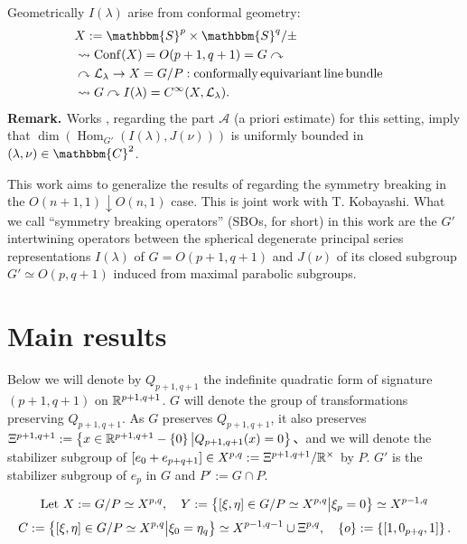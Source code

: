 \documentclass[12pt]{article} %
\newcommand{\assign}{:=}
\newcommand{\tmop}[1]{\ensuremath{\operatorname{#1}}}
\theoremstyle{definition}
\theoremstyle{exampstyle} \newtheorem{examp}[theorem]{Theorem}
\newcommand{\tmtextbf}[1]{{\bfseries{#1}}}
\renewcommand{\setminus}{-}
\begin{document}
 Geometrically $I (\lambda)$ arise from conformal
geometry:
\begin{eqnarray}
  & X \assign \mathbbm{S}^p \times \mathbbm{S}^q / \pm &  \nonumber\\
  & \rightsquigarrow \tmop{Conf} (X) = O (p + 1, q + 1) = G \curvearrowright
  &  \nonumber\\
  & \curvearrowright \mathcal{L}_{\lambda} \rightarrow X = G / P :
  \tmop{conformally} \tmop{equivariant} \tmop{line} \tmop{bundle} & 
  \nonumber\\
  & \rightsquigarrow G \curvearrowright I (\lambda) = C^{\infty} (X,
  \mathcal{L}_{\lambda}) . &  \nonumber
\end{eqnarray}
{\noindent}\tmtextbf{Remark. }Works {\cite{kobayashi2013finite}},
{\cite{kobayashi2014classification}} regarding the part $\mathcal{A}$ (a
priori estimate) for this setting, imply that $\dim (\tmop{Hom}_{G'} (I
(\lambda), J (\nu)))$ is uniformly bounded in $(\lambda, \nu) \in
\mathbbm{C}^2$.{\hspace*{\fill}}{\medskip}


\begin{spacing}{0.8}
	This work aims to generalize the results of \cite{kobayashi2015symmetry}
	regarding the symmetry breaking in the $O(n+1,1)\downarrow O(n,1)$ case. This is joint work with T. Kobayashi.
	What we call ``symmetry breaking operators'' (SBOs, for short) in this work are the $G'$ intertwining operators between the spherical degenerate principal series representations $I(\lambda)$
	of $G=O(p+1,q+1)$ and $J(\nu)$ of its closed subgroup $G'\simeq O(p,q+1)$ induced from maximal parabolic subgroups.
\end{spacing}

\section{Main results}
Below we will denote by $Q_{p+1,q+1}$ the indefinite quadratic form of signature $(p+1,q+1)$ on $\mathbb{R}^{p+1,q+1}$.
$G$ will denote the group of transformations preserving $Q_{p+1,q+1}$. As $G$ preserves $Q_{p+1,q+1}$, it also preserves
$\Xi^{p+1,q+1}:=\mysetn{x\in\R^{p+1,q+1}\setminus\left\{ 0 \right\}}{Q_{p+1,q+1}(x)=0}$、and we will denote the stabilizer subgroup of 
$[e_0+e_{p+q+1}]\in X^{p,q}:=\Xi^{p+1,q+1}/\mathbb{R}^{\times}$ by
$P$. $G'$ is the stabilizer subgroup of $e_p$ in $G$ and $P':=G\cap P$.

\[
	\mbox{Let }X:=G/P\simeq X^{p,q},\quad Y:=\left\{[\xi,\eta]\in G/P\simeq X^{p,q}\big| \xi_{p}=0\right\}\simeq X^{p-1,q}\]
	\[C:=\left\{[\xi,\eta]\in G/P\simeq X^{p,q}\big| \xi_{0}=\eta_q\right\}\simeq X^{p-1,q-1}\cup\Xi^{p,q},\quad\left\{ o \right\}:=\left\{ [1,0_{p+q},1] \right\}.
  \]
\end{document}
